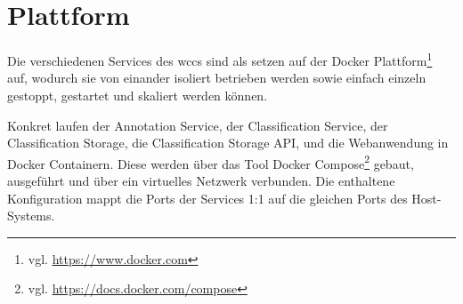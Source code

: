 \section{Plattform}
    Die verschiedenen Services des \gls{wccs} sind als
    setzen auf der Docker Plattform\footnote{vgl. \url{https://www.docker.com}} auf,
    wodurch sie von einander isoliert betrieben werden sowie einfach einzeln
    gestoppt, gestartet und skaliert werden können.

    Konkret laufen
    der Annotation Service,
    der Classification Service,
    der Classification Storage,
    die Classification Storage API,
    und die Webanwendung in Docker Containern.
    Diese werden über das Tool Docker Compose\footnote{vgl. \url{https://docs.docker.com/compose}}
    gebaut, ausgeführt und über ein virtuelles Netzwerk verbunden.
    Die enthaltene Konfiguration mappt die Ports der Services
    1:1 auf die gleichen Ports des Host-Systems.
